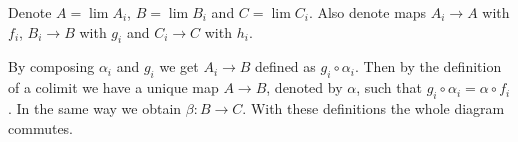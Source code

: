 \begin{exercise}{2}
    Denote $A = \lim A_i$, $B = \lim B_i$ and $C = \lim C_i$. Also denote maps
    $A_i \rightarrow A$ with $f_i$, $B_i \rightarrow B$ with $g_i$ and $C_i
    \rightarrow C$ with $h_i$.

    By composing $\alpha_i$ and $g_i$ we get $A_i \rightarrow B$ defined as $g_i
    \circ \alpha_i$. Then by the definition of a colimit we have a unique map $A
    \rightarrow B$, denoted by $\alpha$, such that $g_i \circ \alpha_i = \alpha
    \circ f_i$. In the same way we obtain $\beta \colon B \rightarrow C$. With
    these definitions the whole diagram commutes.

\end{exercise}


